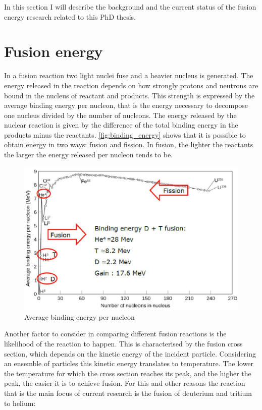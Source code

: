 

In this section I will describe the background and the current status of the fusion energy research related to this PhD thesis.
\section{Fusion energy} \label{Fusion_energy}

In a fusion reaction two light nuclei fuse and a heavier nucleus is generated. The energy released in the reaction depends on how strongly protons and neutrons are bound in the nucleus of reactant and products. This strength is expressed by the average binding energy per nucleon, that is the energy necessary to decompose one nucleus divided by the number of nucleons. The energy released by the nuclear reaction is given by the difference of the total binding energy in the products minus the reactants. \autoref{fig:binding_energy} shows that it is possible to obtain energy in two ways: fusion and fission. In fusion, the lighter the reactants the larger the energy released per nucleon tends to be.

\begin{figure}[!ht]
	\centering
	\includegraphics[width=\linewidth]{Chapters/chapter1/figs/binding energy.PNG}
	\caption{Average binding energy per nucleon \cite{YanNingNaulinVolkerWanBaonianXu2014}}
	\label{fig:binding_energy}
\end{figure}

Another factor to consider in comparing different fusion reactions is the likelihood of the reaction to happen. This is characterised by the fusion cross section, which depends on the kinetic energy of the incident particle. Considering an ensemble of particles this kinetic energy translates to temperature. The lower the temperature for which the cross section reaches its peak, and the higher the peak, the easier it is to achieve fusion.
For this and other reasons the reaction that is the main focus of current research is the fusion of deuterium and tritium to helium: \cite{Miley1974}

